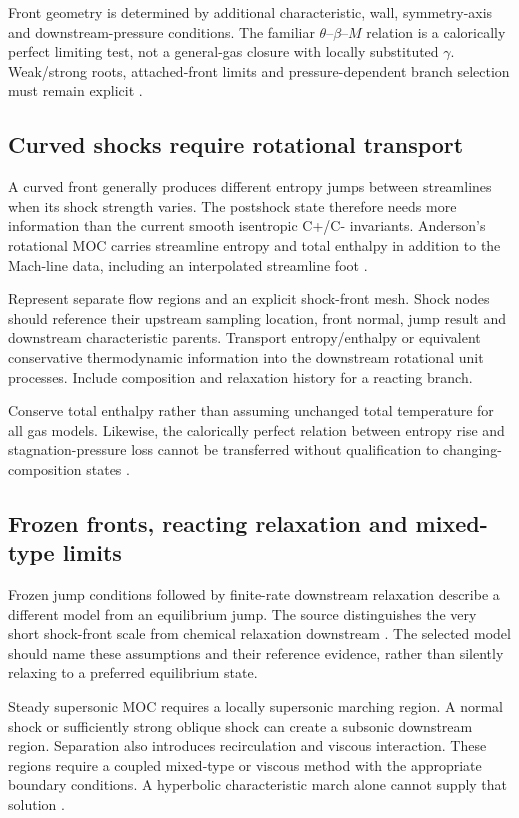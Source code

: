Front geometry is determined by additional characteristic, wall,
symmetry-axis and downstream-pressure conditions. The familiar
\(\theta\)--\(\beta\)--\(M\) relation is a calorically perfect limiting
test, not a general-gas closure with locally substituted \(\gamma\).
Weak/strong roots, attached-front limits and pressure-dependent branch
selection must remain explicit \cite[PDF pp.~152--154]{anderson}.

\subsection{Curved shocks require rotational transport}
A curved front generally produces different entropy jumps between
streamlines when its shock strength varies.
The postshock state therefore needs more information than the current
smooth isentropic C+/C- invariants. Anderson's rotational MOC carries
streamline entropy and total enthalpy in addition to the Mach-line data,
including an interpolated streamline foot
\cite[\S11.9, PDF pp.~423--424]{anderson}.

\proposal Represent separate flow regions and an explicit shock-front
mesh. Shock nodes should reference their upstream sampling location,
front normal, jump result and downstream characteristic parents.
Transport entropy/enthalpy or equivalent conservative thermodynamic
information into the downstream rotational unit processes. Include
composition and relaxation history for a reacting branch.

Conserve total enthalpy rather than assuming unchanged total temperature
for all gas models. Likewise, the calorically perfect relation between
entropy rise and stagnation-pressure loss cannot be transferred without
qualification to changing-composition states
\cite[PDF p.~109, Eqs.~3.61--3.63]{anderson}.

\subsection{Frozen fronts, reacting relaxation and mixed-type limits}
Frozen jump conditions followed by finite-rate downstream relaxation
describe a different model from an equilibrium jump. The source
distinguishes the very short shock-front scale from chemical relaxation
downstream \cite[\S17.10, PDF pp.~690--691]{anderson}.
The selected model should name these assumptions and their reference
evidence, rather than silently relaxing to a preferred equilibrium state.

Steady supersonic MOC requires a locally supersonic marching region.
A normal shock or sufficiently strong oblique shock can create a
subsonic downstream region. Separation also introduces recirculation and
viscous interaction. These regions require a coupled mixed-type or
viscous method with the appropriate boundary conditions. A hyperbolic
characteristic march alone cannot supply that solution
\cite[PDF p.~411]{anderson}\cite[PDF pp.~4--5]{pns}.

